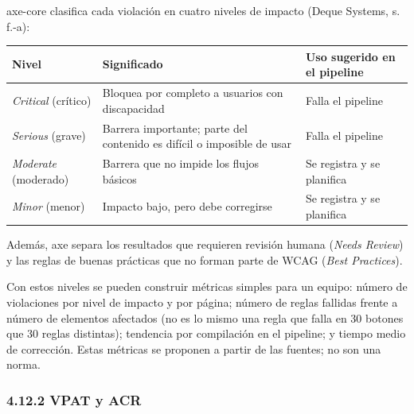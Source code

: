 \documentclass[10pt,letterpaper,onecolumn]{IEEEtran}
\newcommand{\filafina}{\arrayrulecolor{black!30}\specialrule{0.3pt}{1.5pt}{1.5pt}\arrayrulecolor{black}}
\begin{document}
axe-core clasifica cada violación en cuatro niveles de impacto (Deque Systems, s. f.-a):

\begin{longtable}[]{@{}
  >{\raggedright\arraybackslash}p{0.2639\dimexpr\linewidth-4\tabcolsep\relax}
  >{\raggedright\arraybackslash}p{0.4028\dimexpr\linewidth-4\tabcolsep\relax}
  >{\raggedright\arraybackslash}p{0.3333\dimexpr\linewidth-4\tabcolsep\relax}@{}}
\toprule\noalign{}
\begin{minipage}[b]{\linewidth}\raggedright
Nivel
\end{minipage} & \begin{minipage}[b]{\linewidth}\raggedright
Significado
\end{minipage} & \begin{minipage}[b]{\linewidth}\raggedright
Uso sugerido en el pipeline
\end{minipage} \\
\midrule\noalign{}
\endhead
\bottomrule\noalign{}
\endlastfoot
\emph{Critical} (crítico) & Bloquea por completo a usuarios con discapacidad & Falla el pipeline \\ \filafina
\emph{Serious} (grave) & Barrera importante; parte del contenido es difícil o imposible de usar & Falla el pipeline \\ \filafina
\emph{Moderate} (moderado) & Barrera que no impide los flujos básicos & Se registra y se planifica \\ \filafina
\emph{Minor} (menor) & Impacto bajo, pero debe corregirse & Se registra y se planifica \\
\end{longtable}

Además, axe separa los resultados que requieren revisión humana (\emph{Needs Review}) y las reglas de buenas prácticas que no forman parte de WCAG (\emph{Best Practices}).

Con estos niveles se pueden construir métricas simples para un equipo: número de violaciones por nivel de impacto y por página; número de reglas fallidas frente a número de elementos afectados (no es lo mismo una regla que falla en 30 botones que 30 reglas distintas); tendencia por compilación en el pipeline; y tiempo medio de corrección. Estas métricas se proponen a partir de las fuentes; no son una norma.

\subsubsection{4.12.2 VPAT y ACR}\label{vpat-y-acr}
\end{document}
